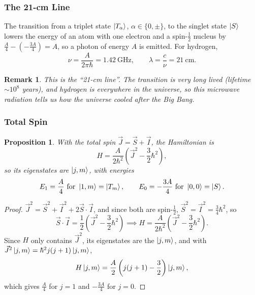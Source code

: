 \documentclass{article}
\newtheorem{remark}{Remark}
\newtheorem{proposition}{Proposition}
\begin{document}
\subsubsection{The 21-cm Line}
The transition from a triplet state $\ket{T_\alpha}$, $\alpha \in \{0, \pm\}$, to the singlet state $\ket{S}$ lowers the energy of an atom with one electron and a spin-$\frac{1}{2}$ nucleus by $\frac{A}{4}-(-\frac{3A}{4}) = A$, so a photon of energy $A$ is emitted. For hydrogen,
\begin{equation}
    \nu = \frac{A}{2\pi\hbar} = 1.42\ \mathrm{GHz}, \qquad \lambda = \frac{c}{\nu} = 21\ \mathrm{cm}.
\end{equation}
\begin{remark}
    This is the ``21-cm line''. The transition is very long lived (lifetime $\sim 10^8$ years), and hydrogen is everywhere in the universe, so this microwave radiation tells us how the universe cooled after the Big Bang.
\end{remark}

\subsubsection{Total Spin}
\begin{proposition}
    With the total spin $\vec{J} = \vec{S} + \vec{I}$, the Hamiltonian is
    \begin{equation}
        H = \frac{A}{2\hbar^2}\left(\vec{J}^2 - \frac{3}{2}\hbar^2\right),
    \end{equation}
    so its eigenstates are $\ket{j,m}$, with energies
    \begin{equation*}
        E_1 = \frac{A}{4} \text{ for } \ket{1,m} = \ket{T_m}, \qquad E_0 = -\frac{3A}{4} \text{ for } \ket{0,0} = \ket{S}.
    \end{equation*}
\end{proposition}
\begin{proof}
    $\vec{J}^2 = \vec{S}^2 + \vec{I}^2 + 2\vec{S}\cdot\vec{I}$, and since both are spin-$\frac{1}{2}$, $\vec{S}^2 = \vec{I}^2 = \frac{3}{4}\hbar^2$, so
    \begin{equation*}
        \vec{S}\cdot\vec{I} = \frac{1}{2}\left(\vec{J}^2 - \frac{3}{2}\hbar^2\right) \implies H = \frac{A}{2\hbar^2}\left(\vec{J}^2 - \frac{3}{2}\hbar^2\right).
    \end{equation*}
    Since $H$ only contains $\vec{J}^2$, its eigenstates are the $\ket{j,m}$, and with $\vec{J}^2\ket{j,m} = \hbar^2 j(j+1)\ket{j,m}$,
    \begin{equation*}
        H\ket{j,m} = \frac{A}{2}\left(j(j+1) - \frac{3}{2}\right)\ket{j,m},
    \end{equation*}
    which gives $\frac{A}{4}$ for $j = 1$ and $-\frac{3A}{4}$ for $j = 0$.
\end{proof}
\end{document}
